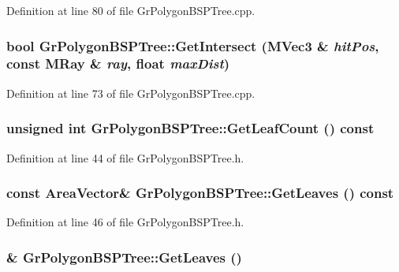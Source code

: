 Definition at line 80 of file GrPolygonBSPTree.cpp.\hypertarget{class_gr_polygon_b_s_p_tree_ed4a3f944b1bf1bfad2e72a21b9d4787}{
\subsubsection[{GetIntersect}]{\setlength{\rightskip}{0pt plus 5cm}bool GrPolygonBSPTree::GetIntersect ({\bf MVec3} \& {\em hitPos}, \/  const {\bf MRay} \& {\em ray}, \/  float {\em maxDist})}}
\label{class_gr_polygon_b_s_p_tree_ed4a3f944b1bf1bfad2e72a21b9d4787}




Definition at line 73 of file GrPolygonBSPTree.cpp.\hypertarget{class_gr_polygon_b_s_p_tree_dba1e63e49f597a249ed04e04070272f}{
\subsubsection[{GetLeafCount}]{\setlength{\rightskip}{0pt plus 5cm}unsigned int GrPolygonBSPTree::GetLeafCount () const}}
\label{class_gr_polygon_b_s_p_tree_dba1e63e49f597a249ed04e04070272f}




Definition at line 44 of file GrPolygonBSPTree.h.\hypertarget{class_gr_polygon_b_s_p_tree_d836dc6e36f8258c501dfa10de5ec6cc}{
\subsubsection[{GetLeaves}]{\setlength{\rightskip}{0pt plus 5cm}const {\bf AreaVector}\& GrPolygonBSPTree::GetLeaves () const}}
\label{class_gr_polygon_b_s_p_tree_d836dc6e36f8258c501dfa10de5ec6cc}




Definition at line 46 of file GrPolygonBSPTree.h.\hypertarget{class_gr_polygon_b_s_p_tree_1ae0ed62f16e88e6ef4dad79f8486c1a}{
\subsubsection[{GetLeaves}]{\& GrPolygonBSPTree::GetLeaves ()}}
\label{class_gr_polygon_b_s_p_tree_1ae0ed62f16e88e6ef4dad79f8486c1a}




